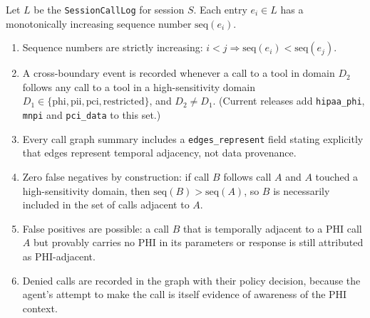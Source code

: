 \begin{property}
\label{prop:temporal}
Let $L$ be the \texttt{SessionCallLog} for session $S$. Each entry $e_i \in L$ has a
monotonically increasing sequence number $\text{seq}(e_i)$.
\begin{enumerate}[leftmargin=1.5em,label=(\alph*)]
  \item Sequence numbers are strictly increasing: $i < j \Rightarrow \text{seq}(e_i) < \text{seq}(e_j)$.
  \item A cross-boundary event is recorded whenever a call to a tool in domain $D_2$ follows
    any call to a tool in a high-sensitivity domain $D_1 \in \{\text{phi}, \text{pii},
    \text{pci}, \text{restricted}\}$, and $D_2 \neq D_1$. (Current releases add
    \texttt{hipaa\_phi}, \texttt{mnpi} and \texttt{pci\_data} to this set.)
  \item Every call graph summary includes a \texttt{edges\_represent} field stating
    explicitly that edges represent temporal adjacency, not data provenance.
  \item Zero false negatives by construction: if call $B$ follows call $A$ and $A$ touched
    a high-sensitivity domain, then $\text{seq}(B) > \text{seq}(A)$, so $B$ is necessarily
    included in the set of calls adjacent to $A$.
  \item False positives are possible: a call $B$ that is temporally adjacent to a PHI call
    $A$ but provably carries no PHI in its parameters or response is still attributed as
    PHI-adjacent.
  \item Denied calls are recorded in the graph with their policy decision, because the
    agent's attempt to make the call is itself evidence of awareness of the PHI context.
\end{enumerate}
\end{property}

